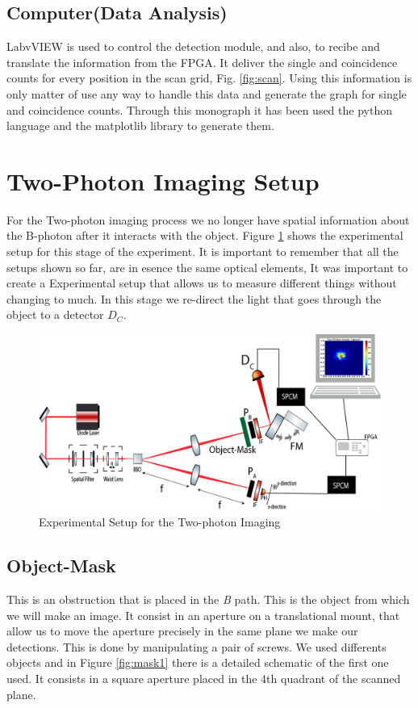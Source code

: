 \subsection{Computer(Data Analysis)}
LabvVIEW is used to control the detection module, and also, to recibe and translate the information
from the FPGA. It deliver the single and coincidence counts for every position in the 
scan grid, Fig. \ref{fig:scan}. Using this information is only matter of use any way to handle
this data and generate the graph for single and coincidence counts. Through this monograph
it has been used the python language and the matplotlib library to generate them.


\section{Two-Photon Imaging Setup}
For the Two-photon imaging process we no longer have spatial information about the  B-photon after it interacts
with the object. Figure \ref{fig:ghostSetup} shows the experimental setup for this stage of the
experiment. It is important to remember that all the setups shown so far, are in esence the same
optical elements, It was important to create a Experimental setup that allows us to 
measure different things without changing to much. In this stage we re-direct the light that 
goes through the object to a detector $D_C$.

\begin{figure}[h!]
\centering
\includegraphics[width=1\textwidth]{Figures/ghostSetup2.png}
\caption{Experimental Setup for the Two-photon Imaging} 
\label{fig:ghostSetup}
\end{figure}

\subsection{Object-Mask}
This is an obstruction that is placed in the \textit{B} path. This is the object
from which we will make an image. It consist in an aperture on a translational mount,
that allow us to move the aperture precisely in the same plane we make our detections.
This is done by manipulating a pair of screws. 
We used differents objects and in Figure \ref{fig:mask1}
there is a detailed schematic of the first one used. It consists in a square aperture placed in the 4th 
quadrant of the scanned plane.

